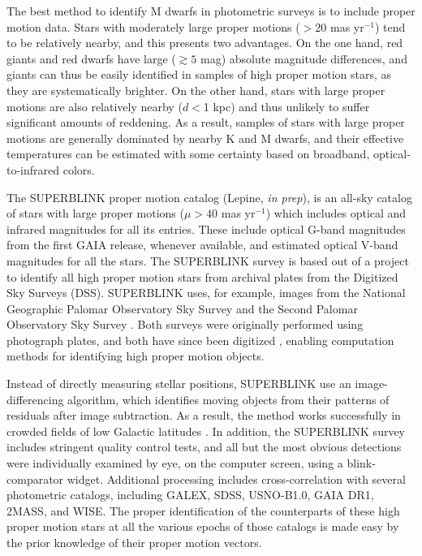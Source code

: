 \documentclass[twocolumn]{aastex62}
\begin{document}
The best method to identify M dwarfs in photometric surveys is to include proper motion data. Stars with moderately large proper motions ($>20$ mas yr$^{-1}$) tend to be relatively nearby, and this presents two advantages. On the one hand, red giants and red dwarfs have large ($\gtrsim5$ mag) absolute magnitude differences, and giants can thus be easily identified in samples of high proper motion stars, as they are systematically brighter. On the other hand, stars with large proper motions are also relatively nearby ($d<$1 kpc) and thus unlikely to suffer significant amounts of reddening. As a result, samples of stars with large proper motions are generally dominated by nearby K and M dwarfs, and their effective temperatures can be estimated with some certainty based on broadband, optical-to-infrared colors.


The SUPERBLINK proper motion catalog (Lepine, {\it in prep}), is an all-sky catalog of stars with large proper motions ($\mu>40$ mas yr$^{-1}$) which includes optical and infrared magnitudes for all its entries. These include optical G-band magnitudes from the first GAIA release, whenever available, and estimated optical V-band magnitudes for all the stars. The SUPERBLINK survey is based out of a project to identify all high proper motion stars from archival plates from the Digitized Sky Surveys (DSS). SUPERBLINK uses, for example, images from the National Geographic Palomar Observatory Sky Survey \citep[POSS I][]{Minkowski1963} and the Second Palomar Observatory Sky Survey \citep[POSS II, conducted roughly 40 years later,][]{Reid1991}.  Both surveys were originally performed using photograph plates, and both have since been digitized \citep[][]{Djorgovski2002,Gal2004,Odewahn2004}, enabling computation methods for identifying high proper motion objects.

Instead of directly measuring stellar positions, SUPERBLINK use an image-differencing algorithm, which identifies moving objects from their patterns of residuals after image subtraction. As a result, the method works successfully in crowded fields of low Galactic latitudes \citep[see e.g.][]{Lepine2002}. In addition, the SUPERBLINK survey includes stringent quality control tests, and all but the most obvious detections were individually examined by eye, on the computer screen, using a blink-comparator widget. Additional processing includes cross-correlation with several photometric catalogs, including GALEX, SDSS, USNO-B1.0, GAIA DR1,  2MASS, and WISE. The proper identification of the counterparts of these high proper motion stars at all the various epochs of those catalogs is made easy by the prior knowledge of their proper motion vectors.  
\end{document}

